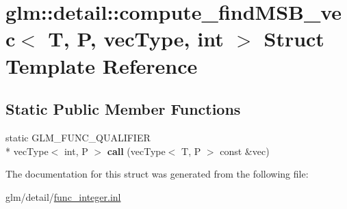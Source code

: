 \hypertarget{structglm_1_1detail_1_1compute__findMSB__vec}{\section{glm\-:\-:detail\-:\-:compute\-\_\-find\-M\-S\-B\-\_\-vec$<$ T, P, vec\-Type, int $>$ Struct Template Reference}
\label{structglm_1_1detail_1_1compute__findMSB__vec}
}
\subsection*{Static Public Member Functions}
\begin{DoxyCompactItemize}
\item 
\hypertarget{structglm_1_1detail_1_1compute__findMSB__vec_a9ea90d2230763f80ab30465fc3a73a65}{static G\-L\-M\-\_\-\-F\-U\-N\-C\-\_\-\-Q\-U\-A\-L\-I\-F\-I\-E\-R \\*
vec\-Type$<$ int, P $>$ {\bfseries call} (vec\-Type$<$ T, P $>$ const \&vec)}\label{structglm_1_1detail_1_1compute__findMSB__vec_a9ea90d2230763f80ab30465fc3a73a65}

\end{DoxyCompactItemize}


The documentation for this struct was generated from the following file\-:\begin{DoxyCompactItemize}
\item 
glm/detail/\hyperlink{func__integer_8inl}{func\-\_\-integer.\-inl}\end{DoxyCompactItemize}
